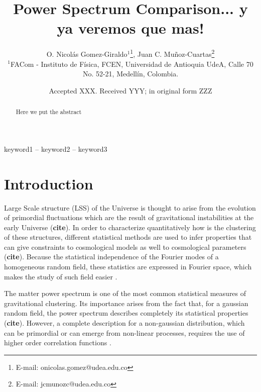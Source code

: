 \documentclass[a4paper,fleqn,usenatbib]{mnras}
\title[Power Spectrum Comparison...]{Power Spectrum Comparison... y ya veremos 
que mas!}
\author[O. Nicol\'as Gomez-Giraldo, Juan C. Mu\~noz-Cuartas]{
O. Nicol\'as Gomez-Giraldo$^{1}$\thanks{E-mail: onicolas.gomez@udea.edu.co},
Juan C. Mu\~noz-Cuartas\thanks{E-mail: jcmunozc@udea.edu.co}
\\
$^{1}$FACom - Instituto de F\'isica, FCEN, Universidad de Antioquia UdeA, Calle 
70 No. 52-21, Medell\'in, Colombia.\\}
\date{Accepted XXX. Received YYY; in original form ZZZ}
\begin{document}
\label{firstpage}
\pagerange{\pageref{firstpage}--\pageref{lastpage}}
\maketitle

\begin{abstract}

Here we put the abstract

\end{abstract}

\begin{keywords}
keyword1 -- keyword2 -- keyword3
\end{keywords}


\section{Introduction}

Large Scale structure (LSS) of the Universe is thought to arise from the 
evolution of primordial fluctuations which are the result of gravitational 
instabilities at the early Universe (\textbf{cite}). In order to characterize 
quantitatively how is the clustering of these structures, different 
statistical methods are used to infer properties that can give constraints to 
cosmological models as well to cosmological parameters (\textbf{cite}). Because 
the statistical independence of the Fourier modes of a homogeneous random field, 
these statistics are expressed in Fourier space, which makes the study of such 
field easier \citep{Martinez2002}.

The matter power spectrum is one of the most common statistical measures of 
gravitational clustering. Its importance arises from the fact that, for a 
gaussian random field, the power spectrum describes completely its statistical 
properties (\textbf{cite}). However, a complete description for a non-gaussian 
distribution, which can be primordial or can emerge from non-linear processes, 
requires the use of higher order correlation functions \citep{Peebles1980}.
\end{document}
